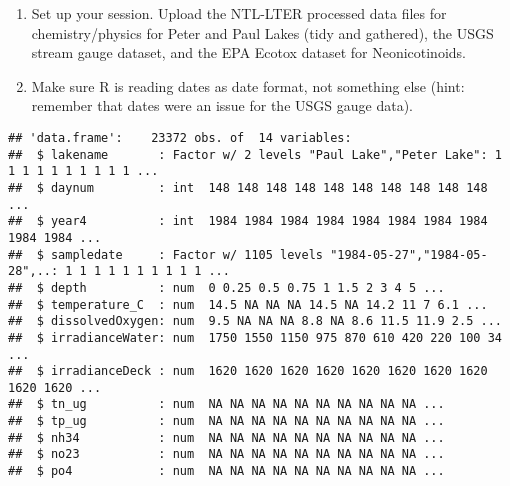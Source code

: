 \documentclass[]{article}
\newenvironment{Shaded}{\begin{snugshade}}{\end{snugshade}}
\newcommand{\KeywordTok}[1]{\textcolor[rgb]{0.13,0.29,0.53}{\textbf{#1}}}
\newcommand{\DataTypeTok}[1]{\textcolor[rgb]{0.13,0.29,0.53}{#1}}
\newcommand{\StringTok}[1]{\textcolor[rgb]{0.31,0.60,0.02}{#1}}
\newcommand{\CommentTok}[1]{\textcolor[rgb]{0.56,0.35,0.01}{\textit{#1}}}
\newcommand{\NormalTok}[1]{#1}
\begin{document}
\begin{enumerate}
\def\labelenumi{\arabic{enumi}.}
\item
  Set up your session. Upload the NTL-LTER processed data files for
  chemistry/physics for Peter and Paul Lakes (tidy and gathered), the
  USGS stream gauge dataset, and the EPA Ecotox dataset for
  Neonicotinoids.
\item
  Make sure R is reading dates as date format, not something else (hint:
  remember that dates were an issue for the USGS gauge data).
\end{enumerate}

\begin{Shaded}
\end{Shaded}

\begin{verbatim}
## 'data.frame':    23372 obs. of  14 variables:
##  $ lakename       : Factor w/ 2 levels "Paul Lake","Peter Lake": 1 1 1 1 1 1 1 1 1 1 ...
##  $ daynum         : int  148 148 148 148 148 148 148 148 148 148 ...
##  $ year4          : int  1984 1984 1984 1984 1984 1984 1984 1984 1984 1984 ...
##  $ sampledate     : Factor w/ 1105 levels "1984-05-27","1984-05-28",..: 1 1 1 1 1 1 1 1 1 1 ...
##  $ depth          : num  0 0.25 0.5 0.75 1 1.5 2 3 4 5 ...
##  $ temperature_C  : num  14.5 NA NA NA 14.5 NA 14.2 11 7 6.1 ...
##  $ dissolvedOxygen: num  9.5 NA NA NA 8.8 NA 8.6 11.5 11.9 2.5 ...
##  $ irradianceWater: num  1750 1550 1150 975 870 610 420 220 100 34 ...
##  $ irradianceDeck : num  1620 1620 1620 1620 1620 1620 1620 1620 1620 1620 ...
##  $ tn_ug          : num  NA NA NA NA NA NA NA NA NA NA ...
##  $ tp_ug          : num  NA NA NA NA NA NA NA NA NA NA ...
##  $ nh34           : num  NA NA NA NA NA NA NA NA NA NA ...
##  $ no23           : num  NA NA NA NA NA NA NA NA NA NA ...
##  $ po4            : num  NA NA NA NA NA NA NA NA NA NA ...
\end{verbatim}
\end{document}
